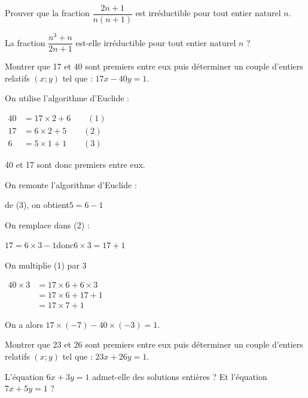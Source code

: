 \documentclass{cornouaille}
\begin{document}
\begin{colonne*exercice}
\begin{exercice}
Prouver que la fraction $\dfrac{2n+1}{n(n+1)}$ est irréductible pour tout entier naturel $n$.
\end{exercice}

\begin{exercice}
La fraction $\dfrac{n^3+n}{2n+1}$ est-elle irréductible pour tout entier naturel $n$ ?
\end{exercice}

\begin{exercice*}
\label{exo-sol_particuliere}
Montrer que 17 et 40 sont premiers entre eux puis déterminer un couple d’entiers relatifs $(x;y)$ tel que : $17x-40y= 1$.
\end{exercice*}
\begin{corrige}
  On utilise l'algorithme d'Euclide :

$\begin{aligned}
40&=17\times2+6\qquad (1)\\
17&=6\times2+5\qquad (2)\\
6&=5\times1+1\qquad (3)\end{aligned}$\medskip

40 et 17 sont donc premiers entre eux.\medskip

On remonte l'algorithme d'Euclide :

de (3), on obtient\enskip $5=6-1$\medskip

On remplace dans (2) :

$17=6\times3-1$\enskip donc\enskip $6\times3=17+1$\medskip

On multiplie (1) par 3

$\begin{aligned}
40\times3&=17\times6+6\times3\\
				 &=17\times6+17+1\\
				 &=17\times7+1\end{aligned}$\medskip
				
On a alors \enskip $17\times(-7)-40\times(-3)=1$.
\end{corrige}

\begin{exercice}
Montrer que 23 et 26 sont premiers entre eux puis déterminer un couple d'entiers relatifs $(x;y)$ tel que : $23x + 26y = 1$.
\end{exercice}

\begin{exercice}
L’équation $6x + 3y = 1$ admet-elle des solutions entières ? Et l'équation $7x + 5y = 1$ ?
\end{exercice}


\end{colonne*exercice}
\end{document}
